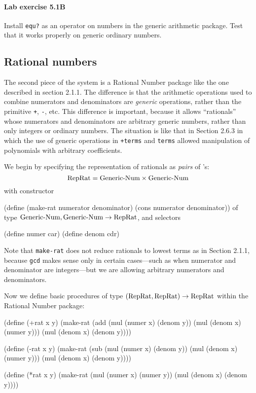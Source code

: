\paragraph{Lab exercise 5.1B}
Install {\tt equ?} as an operator on numbers in the generic arithmetic
package.  Test that it works properly on generic ordinary numbers.


\subsection{Rational numbers}

The second piece of the system is a Rational Number package like the one
described in section 2.1.1.  The difference is that the arithmetic
operations used to combine numerators and denominators are {\em generic}
operations, rather than the primitive {\tt +}, {\tt -}, etc.  This
difference is important, because it allows ``rationals'' whose numerators
and denominators are arbitrary generic numbers, rather than only integers
or ordinary numbers.  The situation is like that in Section 2.6.3 in which
the use of generic operations in {\tt +terms} and {\tt *terms} allowed
manipulation of polynomials with arbitrary coefficients.

We begin by specifying the representation of rationals as {\em pairs} of
\GN's:
\[\mbox{RepRat} = \mbox{Generic-\-Num}\times\mbox{Generic-\-Num}\]
with constructor

\beginlisp
(define (make-rat numerator denominator)
  (cons numerator denominator))
\endlisp
of type $\mbox{Generic-\-Num}, \mbox{Generic-\-Num} \rightarrow \mbox{RepRat}$, and selectors

\beginlisp
(define numer car)
(define denom cdr)
\endlisp

Note that {\tt make-rat} does not reduce rationals to lowest terms as in
Section 2.1.1, because {\tt gcd} makes sense only in certain cases---such
as when numerator and denominator are integers---but we are allowing
arbitrary numerators and denominators.

Now we define basic procedures of type $(\mbox{RepRat}, \mbox{RepRat}) \rightarrow \mbox{RepRat}$ within the
Rational Number package:

\beginlisp
(define (+rat x y)
  (make-rat (add (mul (numer x) (denom y))
                 (mul (denom x) (numer y)))
            (mul (denom x) (denom y))))

(define (-rat x y)
  (make-rat (sub (mul (numer x) (denom y))
                 (mul (denom x) (numer y)))
            (mul (denom x) (denom y))))

(define (*rat x y)
  (make-rat (mul (numer x) (numer y))
            (mul (denom x) (denom y))))

